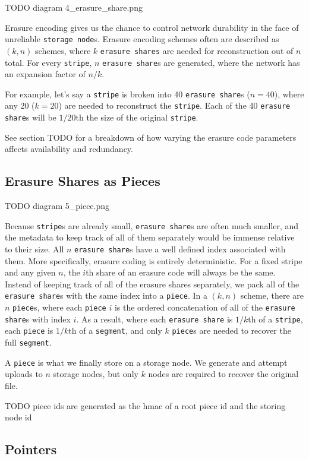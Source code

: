 \documentclass[11pt,fleqn,openany]{book}
\newcommand{\x}[1]{{\tt #1}} \newcommand{\code}[1]{{\em #1}}
\newcommand{\todo}[1]{{\color{red} TODO #1 }}
\begin{document}
\todo{diagram 4\_erasure\_share.png}

Erasure encoding gives us the chance to control network durability in the face
of unreliable \x{storage node}s. Erasure encoding schemes often are
described as $(k, n)$ schemes, where $k$ \x{erasure shares} are needed for
reconstruction out of $n$ total. For every \x{stripe}, $n$ \x{erasure share}s
are generated, where the network has an expansion factor of $n/k$.

For example, let's say a \x{stripe} is broken into 40 \x{erasure share}s
($n=40$), where any 20 ($k=20$) are needed to reconstruct the \x{stripe}. Each
of the 40 \x{erasure share}s will be $1/20$th the size of the original
\x{stripe}.


See section \todo{} for a breakdown of how varying the erasure code parameters
affects availability and redundancy.

\subsection{Erasure Shares as Pieces}

\todo{diagram 5\_piece.png}

Because \x{stripe}s are already small, \x{erasure share}s are often much
smaller, and the metadata to keep track of all of them separately would be
immense relative to their size.
All $n$ \x{erasure share}s have a well defined index associated
with them. More specifically, erasure coding is entirely deterministic. For
a fixed stripe and any given $n$, the $i$th share of an erasure
code will always be the same.
Instead of keeping track of all of the
erasure shares separately, we pack all of the \x{erasure share}s with the
same index into a \x{piece}.
In a $(k, n)$ scheme, there are $n$ \x{piece}s, where each
\x{piece} $i$ is the ordered concatenation of all of the \x{erasure share}s with
index $i$. As a result, where each \x{erasure share} is $1/k$th of a
\x{stripe}, each \x{piece} is $1/k$th of a \x{segment}, and only $k$
\x{piece}s are needed to recover the full \x{segment}.

A \x{piece} is what
we finally store on a storage node. We generate and attempt uploads to $n$
storage nodes, but only $k$ nodes are required to recover the original file.

\todo{piece ids are generated as the hmac of a root piece id and the storing
node id}

\subsection{Pointers}
\end{document}
